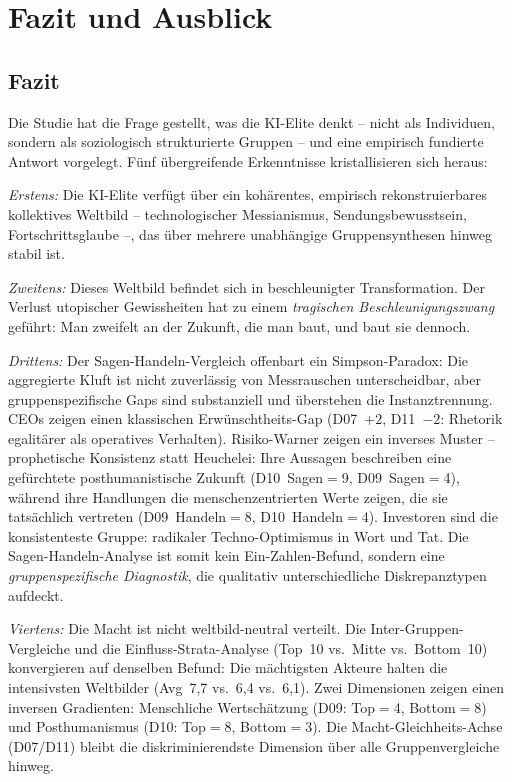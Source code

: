 \documentclass[12pt,a4paper]{article}
\begin{document}
\section{Fazit und Ausblick}
\label{sec:fazit}

\subsection{Fazit}

Die Studie hat die Frage gestellt, was die KI-Elite denkt -- nicht als Individuen, sondern als soziologisch strukturierte Gruppen -- und eine empirisch fundierte Antwort vorgelegt. F\"unf \"ubergreifende Erkenntnisse kristallisieren sich heraus:

\emph{Erstens:} Die KI-Elite verf\"ugt \"uber ein koh\"arentes, empirisch rekonstruierbares kollektives Weltbild -- technologischer Messianismus, Sendungsbewusstsein, Fortschrittsglaube --, das \"uber mehrere unabh\"angige Gruppensynthesen hinweg stabil ist.

\emph{Zweitens:} Dieses Weltbild befindet sich in beschleunigter Transformation. Der Verlust utopischer Gewissheiten hat zu einem \emph{tragischen Beschleunigungszwang} gef\"uhrt: Man zweifelt an der Zukunft, die man baut, und baut sie dennoch.

\emph{Drittens:} Der Sagen-Handeln-Vergleich offenbart ein Simpson-Paradox: Die aggregierte Kluft ist nicht zuverl\"assig von Messrauschen unterscheidbar, aber gruppenspezifische Gaps sind substanziell und \"uberstehen die Instanztrennung. CEOs zeigen einen klassischen Erw\"unschtheits-Gap (D07~$+2$, D11~$-2$: Rhetorik egalit\"arer als operatives Verhalten). Risiko-Warner zeigen ein inverses Muster -- prophetische Konsistenz statt Heuchelei: Ihre Aussagen beschreiben eine gef\"urchtete posthumanistische Zukunft (D10~Sagen$=$9, D09~Sagen$=$4), w\"ahrend ihre Handlungen die menschenzentrierten Werte zeigen, die sie tats\"achlich vertreten (D09~Handeln$=$8, D10~Handeln$=$4). Investoren sind die konsistenteste Gruppe: radikaler Techno-Optimismus in Wort und Tat. Die Sagen-Handeln-Analyse ist somit kein Ein-Zahlen-Befund, sondern eine \emph{gruppenspezifische Diagnostik}, die qualitativ unterschiedliche Diskrepanztypen aufdeckt.

\emph{Viertens:} Die Macht ist nicht weltbild-neutral verteilt. Die Inter-Gruppen-Vergleiche und die Einfluss-Strata-Analyse (Top~10 vs.\ Mitte vs.\ Bottom~10) konvergieren auf denselben Befund: Die m\"achtigsten Akteure halten die intensivsten Weltbilder (Avg~7,7 vs.\ 6,4 vs.\ 6,1). Zwei Dimensionen zeigen einen inversen Gradienten: Menschliche Wertsch\"atzung (D09: Top$=$4, Bottom$=$8) und Posthumanismus (D10: Top$=$8, Bottom$=$3). Die Macht-Gleichheits-Achse (D07/D11) bleibt die diskriminierendste Dimension \"uber alle Gruppenvergleiche hinweg.
\end{document}

